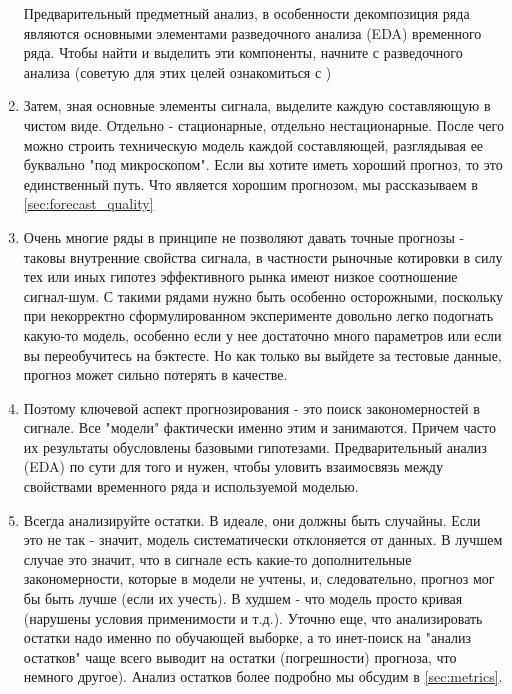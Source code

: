 \begin{enumerate}
{    }
    Предварительный предметный
    анализ, в особенности декомпозиция ряда являются основными
    элементами разведочного анализа (EDA) временного ряда.
    Чтобы найти и выделить эти компоненты, начните с разведочного
    анализа (советую для этих целей ознакомиться с \cite{tukeyEDA1981})

  \item Затем, зная основные элементы сигнала, выделите каждую
    составляющую в чистом виде. Отдельно - стационарные, отдельно
    нестационарные. После чего можно строить техническую модель каждой
    составляющей, разглядывая ее буквально "под микроскопом". Если вы
    хотите иметь хороший прогноз, то это единственный путь. Что
    является хорошим прогнозом, мы рассказываем в
    \autoref{sec:forecast_quality}

  \item Очень многие ряды в принципе не позволяют давать точные
    прогнозы - таковы внутренние свойства сигнала, в частности
    рыночные котировки в силу тех или иных гипотез эффективного
    рынка имеют низкое соотношение сигнал-шум. С такими рядами
    нужно быть особенно осторожными, поскольку при некорректно
    сформулированном эксперименте довольно легко подогнать
    какую-то модель, особенно если у нее достаточно много
    параметров или если вы переобучитесь на
    бэктесте. Но как только вы выйдете за тестовые данные, прогноз
    может сильно потерять в качестве.
  \item Поэтому ключевой аспект прогнозирования - это поиск
    закономерностей в сигнале. Все "модели" фактически именно этим
    и занимаются. Причем часто их
    результаты обусловлены базовыми гипотезами. Предварительный
    анализ (EDA) по сути для того и нужен, чтобы уловить
    взаимосвязь между свойствами временного ряда и используемой моделью.

  \item Всегда анализируйте остатки. В идеале, они должны быть
    случайны. Если это не так - значит, модель
    систематически отклоняется от данных. В лучшем случае это значит, что
    в сигнале есть какие-то дополнительные закономерности, которые в
    модели не учтены, и, следовательно, прогноз мог бы быть лучше (если
    их учесть). В худшем - что модель просто кривая (нарушены условия
    применимости и т.д.). Уточню еще, что анализировать остатки надо
    именно по обучающей выборке, а то инет-поиск на "анализ остатков"
  чаще всего выводит на остатки (погрешности) прогноза, что немного другое).
  Анализ остатков более подробно мы обсудим в \autoref{sec:metrics}.
\end{enumerate}

\printbibliography[heading=subbibliography, title={Источники}]
